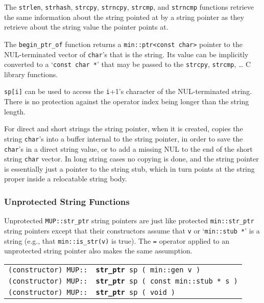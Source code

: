 \documentclass[12pt]{article}
\makeatletter
\newcommand{\ttindex}[1]{\index{#1@{\tt #1}}}
\newcommand{\MUPindex}[1]{\ttindex{MUP::#1}\ttindex{#1}}
\newcommand{\EOL}{\penalty \exhyphenpenalty}
\newenvironment{indpar}[1][0.3in]%
	{\begin{list}{}%
		     {\setlength{\itemsep}{0in}%
		      \setlength{\topsep}{0in}%
		      \setlength{\parsep}{1ex}%
		      \setlength{\labelwidth}{#1}%
		      \setlength{\leftmargin}{#1}%
		      \addtolength{\leftmargin}{\labelsep}}%
	 \item}%
	{\end{list}}
\newcommand{\LABEL}[1]{\label{#1}}
\newcommand{\MUPKEY}[1]{{\tt \bf #1}\MUPindex{#1}}
\makeatother
\begin{document}
The \verb|strlen|, \verb|strhash|, \verb|strcpy|, \verb|strncpy|,
\verb|strcmp|, and \verb|strncmp| functions retrieve the same information
about the string pointed at by a string pointer as they retrieve about
the string value the pointer points at.

The {\tt begin\_ptr\_of} function
returns a {\tt min::ptr<const char>} pointer to
the NUL-terminat\-ed vector of {\tt char}'s that is the string.
Its value can be implicitly converted to a `{\tt const char *}'
that may be passed to the {\tt strcpy}, {\tt strcmp}, \ldots{}
C library functions.

\verb|sp[i]| can be used to access the {\tt i}+1's character of
the NUL-terminated string.
There is no protection against the operator index
being longer than the string length.

For direct and short strings the string pointer, when it is created,
copies the string {\tt char}'s into a buffer internal to the string pointer,
in order to save the {\tt char}'s in a direct string value, or to
add a missing NUL to the end of the short string {\tt char} vector.
In long string cases no copying is done, and the string pointer
is essentially just a pointer to the string stub, which in turn points
at the string proper inside a relocatable string body.

\subsubsection{Unprotected String Functions}
\label{UNPROTECTED-STRING-FUNCTIONS}

Unprotected \verb|MUP::str_ptr| string pointers are 
just like protected \verb|min::str_ptr| string pointers
except that their constructors assume that
\verb|v| or `{\tt min::\EOL stub~*}' is a string
(e.g., that {\tt min::\EOL is\_\EOL str(v)} is
true).  The {\tt =} operator applied to an
unprotected string pointer also makes the same assumption.

\begin{indpar}\begin{tabular}{r@{}l}
\verb|(constructor) MUP::| & \MUPKEY{str\_ptr}\verb| sp ( min::gen v )|
\LABEL{MUP::STR_PTR_OF_GEN} \\
\verb|(constructor) MUP::| & \MUPKEY{str\_ptr}\verb| sp ( const min::stub * s )|
\LABEL{MUP::STR_PTR_OF_STUB} \\
\verb|(constructor) MUP::| & \MUPKEY{str\_ptr}\verb| sp ( void )|
\LABEL{MUP::STR_PTR_OF_VOID} \\
\end{tabular}\end{indpar}
\end{document}

